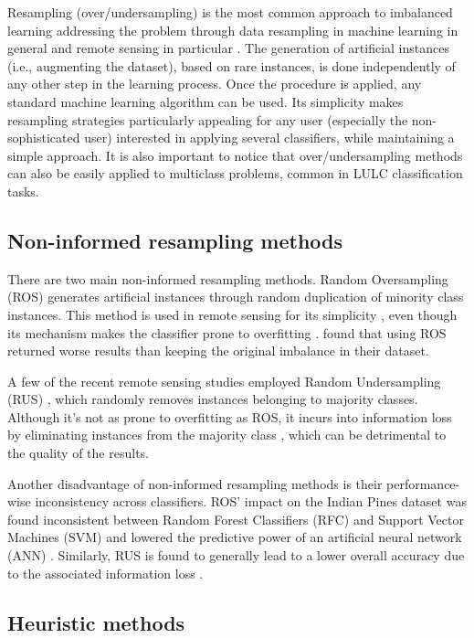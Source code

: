 \documentclass[information,article,submit,moreauthors,pdftex]{Definitions/mdpi}
\begin{document}
\begin{paracol}{2}
Resampling (over/undersampling) is the most common approach to imbalanced
learning addressing the problem through data resampling in machine learning in
general and remote sensing in particular \citep{Feng2019}. The generation of
artificial instances (i.e., augmenting the dataset), based on rare instances,
is done independently of any other step in the learning process. Once the
procedure is applied, any standard machine learning algorithm can be used. Its
simplicity makes resampling strategies particularly appealing for any user
(especially the non-sophisticated user) interested in applying several
classifiers, while maintaining a simple approach.  It is also important to
notice that over/undersampling methods can also be easily applied to
multiclass problems, common in LULC classification tasks.

\subsection{Non-informed resampling methods}

There are two main non-informed resampling methods. Random Oversampling (ROS)
generates artificial instances through random duplication of minority class
instances. This method is used in remote sensing for its simplicity
\citep{Sharififar2019, Hounkpatin2018}, even though its mechanism makes the
classifier prone to overfitting \citep{Krawczyk2016}. \cite{Hounkpatin2018}
found that using ROS returned worse results than keeping the original
imbalance in their dataset.

A few of the recent remote sensing studies employed Random Undersampling (RUS)
\citep{Ferreira2019}, which randomly removes instances belonging to majority
classes. Although it's not as prone to overfitting as ROS, it incurs into
information loss by eliminating instances from the majority class
\citep{Feng2019}, which can be detrimental to the quality of the results.

Another disadvantage of non-informed resampling methods is their
performance-wise inconsistency across classifiers. ROS' impact on the Indian
Pines dataset was found inconsistent between Random Forest Classifiers (RFC)
and Support Vector Machines (SVM) and lowered the predictive power of an
artificial neural network (ANN) \citep{Maxwell2018}. Similarly, RUS is found to
generally lead to a lower overall accuracy due to the associated information
loss \citep{Maxwell2018}.

\subsection{Heuristic methods}


\end{paracol}
\end{document}
